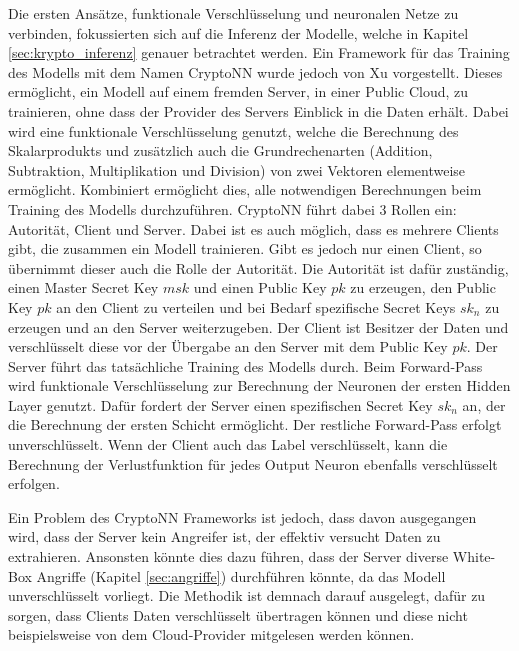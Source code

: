 Die ersten Ansätze, funktionale Verschlüsselung und neuronalen Netze zu verbinden, fokussierten sich auf die Inferenz der Modelle, welche in Kapitel \ref{sec:krypto_inferenz} genauer betrachtet werden.
Ein Framework für das Training des Modells mit dem Namen CryptoNN wurde jedoch von Xu \etal \cite{P-53} vorgestellt.
Dieses ermöglicht, ein Modell auf einem fremden Server, \zB in einer Public Cloud, zu trainieren, ohne dass der Provider des Servers Einblick in die Daten erhält.
Dabei wird eine funktionale Verschlüsselung genutzt, welche die Berechnung des Skalarprodukts und zusätzlich auch die Grundrechenarten (Addition, Subtraktion, Multiplikation und Division) von zwei Vektoren elementweise ermöglicht.
Kombiniert ermöglicht dies, alle notwendigen Berechnungen beim Training des Modells durchzuführen.
CryptoNN führt dabei 3 Rollen ein: Autorität, Client und Server. 
Dabei ist es auch möglich, dass es mehrere Clients gibt, die zusammen ein Modell trainieren.
Gibt es jedoch nur einen Client, so übernimmt dieser auch die Rolle der Autorität.
Die Autorität ist dafür zuständig, einen Master Secret Key $msk$ und einen Public Key $pk$ zu erzeugen, den Public Key $pk$ an den Client zu verteilen und bei Bedarf spezifische Secret Keys $sk_n$ zu erzeugen und an den Server weiterzugeben.
Der Client ist Besitzer der Daten und verschlüsselt diese vor der Übergabe an den Server mit dem Public Key $pk$. 
Der Server führt das tatsächliche Training des Modells durch.
Beim Forward-Pass wird funktionale Verschlüsselung zur Berechnung der Neuronen der ersten Hidden Layer genutzt.
Dafür fordert der Server einen spezifischen Secret Key $sk_n$ an, der die Berechnung der ersten Schicht ermöglicht.
Der restliche Forward-Pass erfolgt unverschlüsselt.
Wenn der Client auch das Label verschlüsselt, kann die Berechnung der Verlustfunktion für jedes Output Neuron ebenfalls verschlüsselt erfolgen.

Ein Problem des CryptoNN Frameworks ist jedoch, dass davon ausgegangen wird, dass der Server kein Angreifer ist, der effektiv versucht Daten zu extrahieren.
Ansonsten könnte dies dazu führen, dass der Server diverse White-Box Angriffe (Kapitel \ref{sec:angriffe}) durchführen könnte, da das Modell unverschlüsselt vorliegt.
Die Methodik ist demnach darauf ausgelegt, dafür zu sorgen, dass Clients Daten verschlüsselt übertragen können und diese nicht beispielsweise von dem Cloud-Provider mitgelesen werden können.


